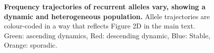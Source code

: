 \documentclass[12pt, oneside]{article}   	%
\begin{document}
\begin{figure}
\label{fig:supfig9}
\centering
{}
\caption{\textbf{Frequency trajectories of recurrent alleles vary, showing a dynamic and heterogeneous population.} Allele trajectories are colour-coded in a way that reflects Figure 2D in the main text. Green: ascending dynamics, Red: descending dynamic, Blue: Stable, Orange: sporadic.}
\end{figure}
\end{document}
